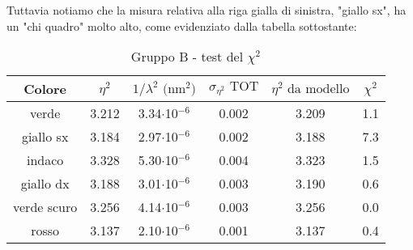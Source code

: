 Tuttavia notiamo che la misura relativa alla riga gialla di sinistra, "giallo sx", ha un "chi quadro" molto alto, come evidenziato dalla tabella sottostante:
\begin{table}[!htbp]
    {\par\centering
    \begin{tabular}{cccccc}
        \hline
            Colore &
            $\eta^2$ &
            $1/\lambda^2 \text{ (nm$^2$)}$ &
            $\sigma_{\eta^2} \text{ TOT}$ &
            $\eta^2 \text{ da modello}$ &
            $\chi^2$\\
        \hline
        verde       &   3.212   &   3.34$\cdot$10$^{-6}$  & 0.002   &   3.209   &   1.1\\
        giallo sx   &   3.184   &   2.97$\cdot$10$^{-6}$  & 0.002   &   3.188   &   7.3\\
        indaco      &   3.328   &   5.30$\cdot$10$^{-6}$  & 0.004   &   3.323   &   1.5\\
        giallo dx   &   3.188   &   3.01$\cdot$10$^{-6}$  & 0.003   &   3.190   &   0.6\\
        verde scuro &   3.256   &   4.14$\cdot$10$^{-6}$  & 0.003   &   3.256   &   0.0\\
        rosso       &   3.137   &   2.10$\cdot$10$^{-6}$  & 0.001   &   3.137   &   0.4\\
        \hline
    \end{tabular}
    \par}
    \caption{Gruppo B - test del $\chi^2$}
\end{table}